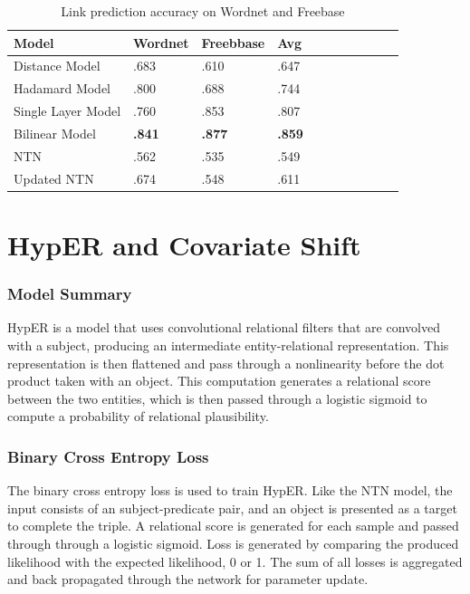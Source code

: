 \begin{table}[H]
	\caption{Link prediction accuracy on Wordnet and Freebase}
	\centering
	\begin{tabular}{lllllllllll}
  		\textbf{Model} & \textbf{Wordnet} & \textbf{Freebbase} & \textbf{Avg} \\
  		\hline
  		Distance Model & .683 & .610 & .647 \\
  		Hadamard Model & .800 & .688 & .744 \\
  		Single Layer Model & .760 & .853 & .807 \\
  		Bilinear Model & \textbf{.841} & \textbf{.877} & \textbf{.859} \\
  		NTN & .562 & .535 & .549 \\
  		\hline
  		Updated NTN & .674 & .548 & .611 \\
	\end{tabular}
\end{table}



\section{HypER and Covariate Shift}

\subsubsection{Model Summary} 
HypER is a model that uses convolutional relational filters that are convolved with a subject, producing an intermediate entity-relational representation. This representation is then flattened and pass through a nonlinearity before the dot product taken with an object. This computation generates a relational score between the two entities, which is then passed through a logistic sigmoid to compute a probability of relational plausibility. \newpage

\subsubsection{Binary Cross Entropy Loss}
The binary cross entropy loss is used to train HypER. Like the NTN model, the input consists of an subject-predicate pair, and an object is presented as a target to complete the triple. A relational score is generated for each sample and passed through through a logistic sigmoid. Loss is generated by comparing the produced likelihood with the expected likelihood, 0 or 1. The sum of all losses is aggregated and back propagated through the network for parameter update. 


